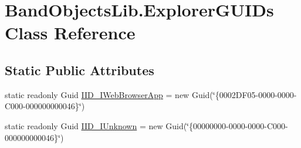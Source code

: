 \hypertarget{class_band_objects_lib_1_1_explorer_g_u_i_ds}{\section{Band\+Objects\+Lib.\+Explorer\+G\+U\+I\+Ds Class Reference}
\label{class_band_objects_lib_1_1_explorer_g_u_i_ds}
}
\subsection*{Static Public Attributes}
\begin{DoxyCompactItemize}
\item 
static readonly Guid \hyperlink{class_band_objects_lib_1_1_explorer_g_u_i_ds_a71ffc05393a492f0d86efd47e49fe4c6}{I\+I\+D\+\_\+\+I\+Web\+Browser\+App} = new Guid(\char`\"{}\{0002\+D\+F05-\/0000-\/0000-\/\+C000-\/000000000046\}\char`\"{})
\item 
static readonly Guid \hyperlink{class_band_objects_lib_1_1_explorer_g_u_i_ds_a1f4ada2953b3094dffda5ebee6119e95}{I\+I\+D\+\_\+\+I\+Unknown} = new Guid(\char`\"{}\{00000000-\/0000-\/0000-\/C000-\/000000000046\}\char`\"{})
\end{DoxyCompactItemize}


